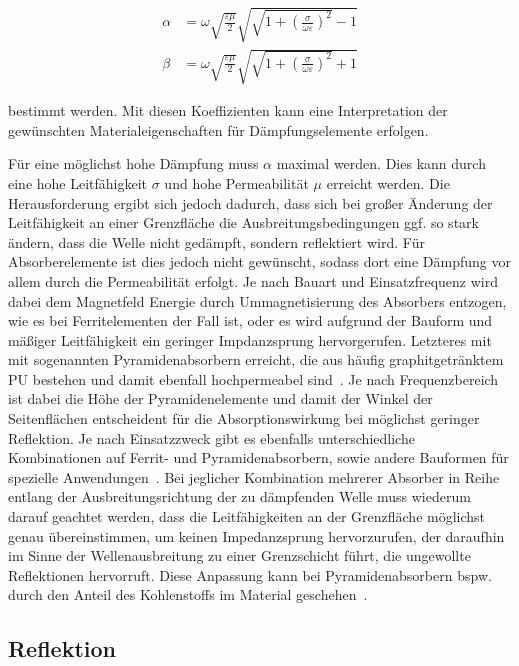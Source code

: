 \begin{align}
    \alpha &= \omega \sqrt{\frac{\varepsilon \mu}{2}} \sqrt{\sqrt{1+\left(\frac{\sigma}{\omega\varepsilon}\right)^2}-1} \\
    \beta &= \omega \sqrt{\frac{\varepsilon \mu}{2}} \sqrt{\sqrt{1+\left(\frac{\sigma}{\omega\varepsilon}\right)^2}+1}
\end{align}

bestimmt werden. Mit diesen Koeffizienten kann eine Interpretation der gewünschten Materialeigenschaften für Dämpfungselemente erfolgen. 
\par
\vspace{\linespace}
Für eine möglichst hohe Dämpfung muss $\alpha$ maximal werden. Dies kann durch eine hohe Leitfähigkeit $\sigma$ und hohe Permeabilität $\mu$ erreicht werden. Die Herausforderung ergibt sich jedoch dadurch, dass sich bei großer Änderung der Leitfähigkeit an einer Grenzfläche die Ausbreitungsbedingungen ggf. so stark ändern, dass die Welle nicht gedämpft, sondern reflektiert wird. Für Absorberelemente ist dies jedoch nicht gewünscht, sodass dort eine Dämpfung vor allem durch die Permeabilität erfolgt. Je nach Bauart und Einsatzfrequenz wird dabei dem Magnetfeld Energie durch Ummagnetisierung des Absorbers entzogen, wie es bei Ferritelementen der Fall ist, oder es wird aufgrund der Bauform und mäßiger Leitfähigkeit ein geringer Impdanzsprung hervorgerufen. Letzteres mit mit sogenannten Pyramidenabsorbern erreicht, die aus häufig graphitgetränktem \ac{PU} bestehen und damit ebenfall hochpermeabel sind~\cite{EM_Schirmung}. Je nach Frequenzbereich ist dabei die Höhe der Pyramidenelemente und damit der Winkel der Seitenflächen entscheident für die Absorptionswirkung bei möglichst geringer Reflektion. Je nach Einsatzzweck gibt es ebenfalls unterschiedliche Kombinationen auf Ferrit- und Pyramidenabsorbern, sowie andere Bauformen für spezielle Anwendungen~\cite{EMV-Support_Produktseite, Telemeter_Produktseite}. Bei jeglicher Kombination mehrerer Absorber in Reihe entlang der Ausbreitungsrichtung der zu dämpfenden Welle muss wiederum darauf geachtet werden, dass die Leitfähigkeiten an der Grenzfläche möglichst genau übereinstimmen, um keinen Impedanzsprung hervorzurufen, der daraufhin im Sinne der Wellenausbreitung zu einer Grenzschicht führt, die ungewollte Reflektionen hervorruft. Diese Anpassung kann bei Pyramidenabsorbern bspw. durch den Anteil des Kohlenstoffs im Material geschehen~\cite{EM_Schirmung}.




\subsection{Reflektion}\label{cha:2_sub_Reflektion}


